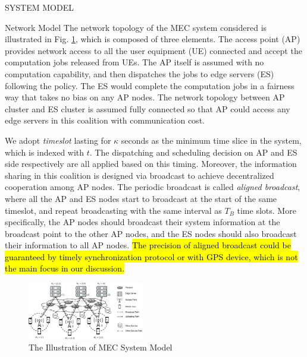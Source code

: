 \documentclass[10pt, conference, letterpaper]{IEEEtran}
\begin{document}
    \begin{section}{SYSTEM MODEL}
        \label{sec:model}
        \begin{subsection}{Network Model}
            The network topology of the MEC system considered is illustrated in Fig. \ref{fig:system}, which is composed of three elements. The access point (AP) provides network access to all the user equipment (UE) connected and accept the computation jobs released from UEs. The AP itself is assumed with no computation capability, and then dispatches the jobs to edge servers (ES) following the policy. The ES would complete the computation jobs in a fairness way that takes no bias on any AP nodes. The network topology between AP cluster and ES cluster is assumed fully connected so that AP could access any edge servers in this coalition with communication cost.

            We adopt \emph{timeslot} lasting for $\kappa$ seconds as the minimum time slice in the system, which is indexed with $t$. The dispatching and scheduling decision on AP and ES side respectively are all applied based on this timing. Moreover, the information sharing in this coalition is designed via broadcast to achieve decentralized cooperation among AP nodes.
            The periodic broadcast is called \emph{aligned broadcast}, where all the AP and ES nodes start to broadcast at the start of the same timeslot, and repeat broadcasting with the same interval as $T_B$ time slots. More specifically, the AP nodes should broadcast their system information at the broadcast point to the other AP nodes, and the ES nodes should also broadcast their information to all AP nodes. \hl{The precision of aligned broadcast could be guaranteed by timely synchronization protocol or with GPS device, which is not the main focus in our discussion.}
            \begin{figure}[ht]
                \centering
                \includegraphics[width=0.45\textwidth, trim={0.5cm 0.5cm 0.5cm 0.5cm}, clip]{system-model.pdf}
                \caption{The Illustration of MEC System Model}
                \label{fig:system}
            \end{figure}


\end{subsection}
\end{section}
\end{document}

